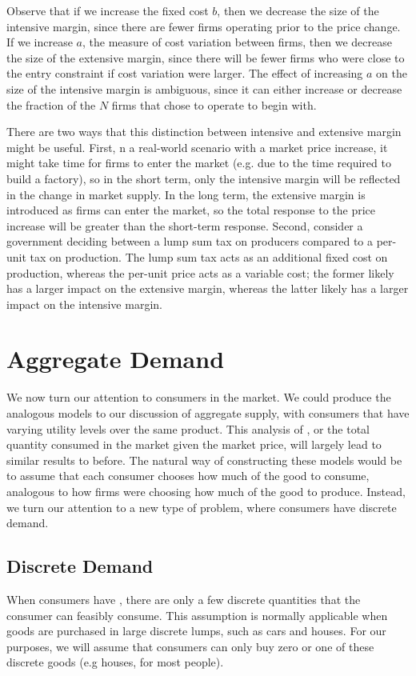 Observe that if we increase the fixed cost $b$, then we decrease the size of the intensive margin, since there are fewer firms operating prior to the price change. If we increase $a$, the measure of cost variation between firms, then we decrease the size of the extensive margin, since there will be fewer firms who were close to the entry constraint if cost variation were larger. The effect of increasing $a$ on the size of the intensive margin is ambiguous, since it can either increase or decrease the fraction of the $N$ firms that chose to operate to begin with.

There are two ways that this distinction between intensive and extensive margin might be useful. First, n a real-world scenario with a market price increase, it might take time for firms to enter the market (e.g. due to the time required to build a factory), so in the short term, only the intensive margin will be reflected in the change in market supply. In the long term, the extensive margin is introduced as firms can enter the market, so the total response to the price increase will be greater than the short-term response. Second, consider a government deciding between a lump sum tax on producers compared to a per-unit tax on production. The lump sum tax acts as an additional fixed cost on production, whereas the per-unit price acts as a variable cost; the former likely has a larger impact on the extensive margin, whereas the latter likely has a larger impact on the intensive margin.

\section{Aggregate Demand}
We now turn our attention to consumers in the market. We could produce the analogous models to our discussion of aggregate supply, with consumers that have varying utility levels over the same product. This analysis of , or the total quantity consumed in the market given the market price, will largely lead to similar results to before. The natural way of constructing these models would be to assume that each consumer chooses how much of the good to consume, analogous to how firms were choosing how much of the good to produce. Instead, we turn our attention to a new type of problem, where consumers have discrete demand.

\subsection*{Discrete Demand}
When consumers have , there are only a few discrete quantities that the consumer can feasibly consume. This assumption is normally applicable when goods are purchased in large discrete lumps, such as cars and houses. For our purposes, we will assume that consumers can only buy zero or one of these discrete goods (e.g houses, for most people).

